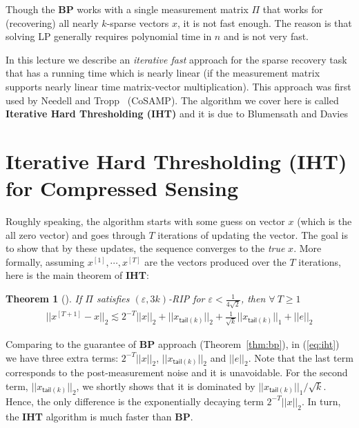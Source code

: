 \documentclass[11pt]{article}
\newcommand{\eps}{\varepsilon}
\newtheorem{theorem}{Theorem}
\def\tail{\mathsf{tail}}
\begin{document}
Though the {\bf BP} works with a single measurement matrix $\Pi$ that works for (recovering) all nearly $k$-sparse vectors $x$, it is not fast enough. The reason is that solving LP generally requires polynomial time in $n$ and is not very fast.

 
In this lecture we describe an {\em iterative fast} approach for the sparse recovery task that has a running time which is nearly linear (if the measurement matrix supports nearly linear time matrix-vector multiplication). This approach was first used by Needell and Tropp~\cite{NeedellT08} (CoSAMP). The algorithm we cover here is called {\bf Iterative Hard Thresholding (IHT)} and it is due to Blumensath and Davies~\cite{BlumensathD09}

\section{Iterative Hard Thresholding (IHT) for Compressed Sensing}
Roughly speaking, the algorithm starts with some guess on vector $x$ (which is the all zero vector) and goes through $T$ iterations of updating the vector. The goal is to show that by these updates, the sequence converges to the {\em true} $x$. More formally, assuming $x^{[1]}, \cdots, x^{[T]}$ are the vectors produced over the $T$ iterations, here is the main theorem of {\bf IHT}:
\begin{theorem}[\cite{BlumensathD09}]\label{thm:iht}
If $\Pi$ satisfies $(\eps, 3k)$-RIP for $\eps < \frac 1{4\sqrt 2}$, then $\forall\ T\ge 1$
\begin{align}\label{eq:iht}
||x^{[T+1] }- x||_2 \lesssim 2^{-T} ||x||_2 + ||x_{\tail(k)}||_2 + \frac{1}{\sqrt{k}}||x_{\tail(k)}||_1 + ||e||_2
\end{align}

\end{theorem}

Comparing to the guarantee of {\bf BP} approach (Theorem~\ref{thm:bp}), in (\ref{eq:iht}) we have three extra terms: $2^{-T} ||x||_2$, $||x_{\tail(k)}||_2$ and $ ||e||_2$. Note that the last term corresponds to the post-measurement noise and it is unavoidable. For the second term, $||x_{\tail(k)}||_2$, we shortly shows that it is dominated by $||x_{\tail(k)}||_1 / {\sqrt{k}}$. Hence, the only difference is the exponentially decaying term $2^{-T} ||x||_2$. In turn, the {\bf IHT} algorithm is much faster than {\bf BP}.  
\end{document}
